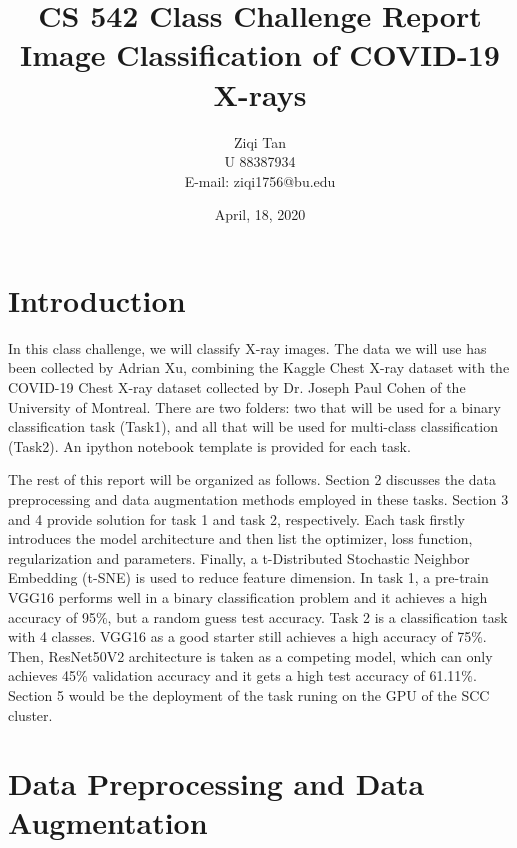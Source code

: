 \documentclass[a4paper,10pt]{article}
\begin{document}
   \title{CS 542 Class Challenge Report \\ Image Classification of COVID-19 X-rays}
   \author{Ziqi Tan \\ U 88387934 \\ E-mail: ziqi1756@bu.edu}
          
   \date{April, 18, 2020}

   \maketitle
   
   \tableofcontents
 
  \newpage
    
\section{Introduction}
In this class challenge, we will classify X-ray images. 
The data we will use has been collected by Adrian Xu, 
combining the Kaggle Chest X-ray dataset with the COVID-19 Chest X-ray dataset collected 
by Dr. Joseph Paul Cohen of the University of Montreal. 
There are two folders: 
two that will be used for a binary classification task (Task1), 
and all that will be used for multi-class classification (Task2). 
An ipython notebook template is provided for each task. 

The rest of this report will be organized as follows. 
Section 2 discusses the data preprocessing and data augmentation methods employed in these tasks.
Section 3 and 4 provide solution for task 1 and task 2, respectively. 
Each task firstly introduces the model architecture and then list the optimizer, loss function, regularization and parameters.
Finally, a t-Distributed Stochastic Neighbor Embedding (t-SNE) is used to reduce feature dimension.
In task 1, a pre-train VGG16 performs well in a binary classification problem
and it achieves a high accuracy of 95\%, but a random guess test accuracy.
Task 2 is a classification task with 4 classes. VGG16 as a good starter still achieves a high accuracy of 75\%. 
Then, ResNet50V2 architecture is taken as a competing model, which can only achieves 45\% validation accuracy 
and it gets a high test accuracy of 61.11\%. Section 5 would be the deployment of the task runing on the GPU of the SCC cluster.


\section{Data Preprocessing and Data Augmentation}
\end{document}

